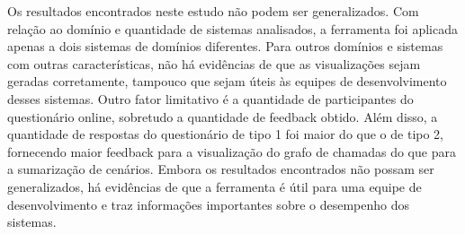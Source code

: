 Os resultados encontrados neste estudo não podem ser generalizados. Com relação ao domínio e quantidade de sistemas analisados, a ferramenta foi aplicada apenas a dois sistemas de domínios diferentes. Para outros domínios e sistemas com outras características, não há evidências de que as visualizações sejam geradas corretamente, tampouco que sejam úteis às equipes de desenvolvimento desses sistemas. Outro fator limitativo é a quantidade de participantes do questionário online, sobretudo a quantidade de feedback obtido. Além disso, a quantidade de respostas do questionário de tipo 1 foi maior do que o de tipo 2, fornecendo maior feedback para a visualização do grafo de chamadas do que para a sumarização de cenários. Embora os resultados encontrados não possam ser generalizados, há evidências de que a ferramenta é útil para uma equipe de desenvolvimento e traz informações importantes sobre o desempenho dos sistemas.
